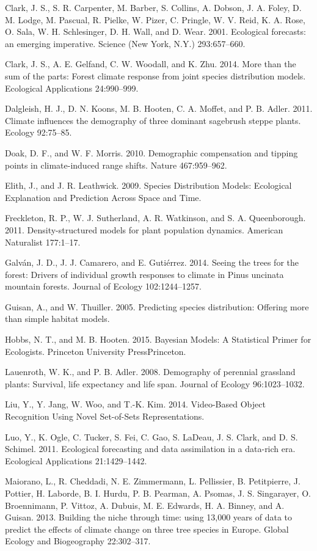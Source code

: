 \documentclass[12pt,]{article}
\begin{document}
Clark, J. S., S. R. Carpenter, M. Barber, S. Collins, A. Dobson, J. A.
Foley, D. M. Lodge, M. Pascual, R. Pielke, W. Pizer, C. Pringle, W. V.
Reid, K. A. Rose, O. Sala, W. H. Schlesinger, D. H. Wall, and D. Wear.
2001. Ecological forecasts: an emerging imperative. Science (New York,
N.Y.) 293:657--660.

Clark, J. S., A. E. Gelfand, C. W. Woodall, and K. Zhu. 2014. More than
the sum of the parts: Forest climate response from joint species
distribution models. Ecological Applications 24:990--999.

Dalgleish, H. J., D. N. Koons, M. B. Hooten, C. A. Moffet, and P. B.
Adler. 2011. Climate influences the demography of three dominant
sagebrush steppe plants. Ecology 92:75--85.

Doak, D. F., and W. F. Morris. 2010. Demographic compensation and
tipping points in climate-induced range shifts. Nature 467:959--962.

Elith, J., and J. R. Leathwick. 2009. Species Distribution Models:
Ecological Explanation and Prediction Across Space and Time.

Freckleton, R. P., W. J. Sutherland, A. R. Watkinson, and S. A.
Queenborough. 2011. Density-structured models for plant population
dynamics. American Naturalist 177:1--17.

Galván, J. D., J. J. Camarero, and E. Gutiérrez. 2014. Seeing the trees
for the forest: Drivers of individual growth responses to climate in
Pinus uncinata mountain forests. Journal of Ecology 102:1244--1257.

Guisan, A., and W. Thuiller. 2005. Predicting species distribution:
Offering more than simple habitat models.

Hobbs, N. T., and M. B. Hooten. 2015. Bayesian Models: A Statistical
Primer for Ecologists. Princeton University PressPrinceton.

Lauenroth, W. K., and P. B. Adler. 2008. Demography of perennial
grassland plants: Survival, life expectancy and life span. Journal of
Ecology 96:1023--1032.

Liu, Y., Y. Jang, W. Woo, and T.-K. Kim. 2014. Video-Based Object
Recognition Using Novel Set-of-Sets Representations.

Luo, Y., K. Ogle, C. Tucker, S. Fei, C. Gao, S. LaDeau, J. S. Clark, and
D. S. Schimel. 2011. Ecological forecasting and data assimilation in a
data-rich era. Ecological Applications 21:1429--1442.

Maiorano, L., R. Cheddadi, N. E. Zimmermann, L. Pellissier, B.
Petitpierre, J. Pottier, H. Laborde, B. I. Hurdu, P. B. Pearman, A.
Psomas, J. S. Singarayer, O. Broennimann, P. Vittoz, A. Dubuis, M. E.
Edwards, H. A. Binney, and A. Guisan. 2013. Building the niche through
time: using 13,000 years of data to predict the effects of climate
change on three tree species in Europe. Global Ecology and Biogeography
22:302--317.
\end{document}
